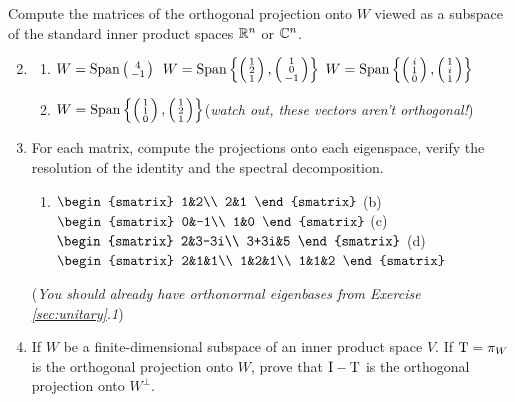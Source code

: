 \begin{exercises}
	\exstart Compute the matrices of the orthogonal projection onto $W$ viewed as a subspace of the standard inner product spaces $\mathbb{R}^n$ or $\mathbb{C}^n$.
	\begin{enumerate}\setcounter{enumi}{1}
	  \item[]\begin{enumerate}
	    \item $W=\operatorname{Span}\left(\begin{smallmatrix}4\\-1\end{smallmatrix}\right)$\hfill {}\ $W=\operatorname{Span}\left\{\left(\begin{smallmatrix}1\\2\\1\end{smallmatrix}\right),\left(\begin{smallmatrix}1\\0\\-1\end{smallmatrix}\right)\right\}$ \hfill {}\space
	    $W=\operatorname{Span}\left\{\left(\begin{smallmatrix}i\\1\\0\end{smallmatrix}\right),\left(\begin{smallmatrix}1\\i\\1\end{smallmatrix}\right)\right\}$\hfill
	    \item[(d)] $W=\operatorname{Span}\left\{\left(\begin{smallmatrix}1\\1\\0\end{smallmatrix}\right),\left(\begin{smallmatrix}1\\2\\1\end{smallmatrix}\right)\right\}$\quad (\emph{watch out, these vectors aren't orthogonal!})
		\end{enumerate}
		
		
		\pagebreak[3]

	  
		\item For each matrix, compute the projections onto each eigenspace, verify the resolution of the identity and the spectral decomposition.
		\begin{enumerate}
	    \item $\begin{smatrix}
	    	1&2\\
	    	2&1
	    \end{smatrix}$
	    \qquad
	    (b)\ \ $\begin{smatrix}
	    	0&-1\\
	    	1&0
	    \end{smatrix}$
	    \qquad
	    (c)\ \ $\begin{smatrix}
	    	2&3-3i\\
	    	3+3i&5
	    \end{smatrix}$
	    \qquad
	    (d)\ \ $\begin{smatrix}
	    	2&1&1\\
	    	1&2&1\\
	    	1&1&2
	    \end{smatrix}$
	  \end{enumerate}
	  (\emph{You should already have orthonormal eigenbases from Exercise \ref*{sec:unitary}.1})
		
		
		\pagebreak[3]
		
		
		\item If $W$ be a finite-dimensional subspace of an inner product space $V$. If $\mathrm{T}=\pi_W$ is the orthogonal projection onto $W$, prove that $\mathrm{I}-\mathrm{T}$ is the orthogonal projection onto $W^\perp$.
		

\end{enumerate}
\end{exercises}
